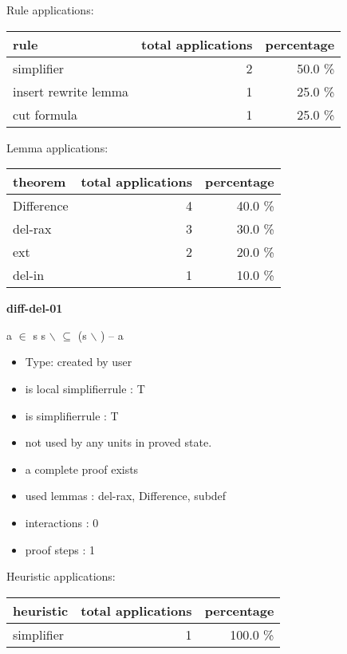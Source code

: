 \documentclass[a4paper]{article}
\begin{document}
Rule applications:

\begin{supertabular}{l|r|r}
rule	        & total applications & percentage \\ \hline
simplifier & 2 & 50.0 \% \\
insert rewrite lemma & 1 & 25.0 \% \\
cut formula & 1 & 25.0 \% \\

\end{supertabular}

Lemma applications:

\begin{supertabular}{l|r|r}
theorem	        & total applications & percentage \\ \hline
Difference & 4 & 40.0 \% \\
del-rax & 3 & 30.0 \% \\
ext & 2 & 20.0 \% \\
del-in & 1 & 10.0 \% \\

\end{supertabular}
\pagebreak

{\LARGE\bf diff-del-01}\label{lemma-diff-del-01}

\medskip

 \Fol \Not a $\in$ s \Imp s $\backslash$  $\subseteq$ (s $\backslash$ ) -- a

\begin{itemize}

\item Type: created by user

\item is local simplifierrule : T
\item is simplifierrule : T
\item not used by any units in proved state.
\item       a complete proof exists
\item       used lemmas  : del-rax, Difference, subdef
\item       interactions : 0
\item       proof steps  : 1
\end{itemize}

\medskip


Heuristic applications:

\begin{supertabular}{l|r|r}
heuristic	& total applications & percentage \\ \hline
simplifier & 1 & 100.0 \% \\

\end{supertabular}
\end{document}
